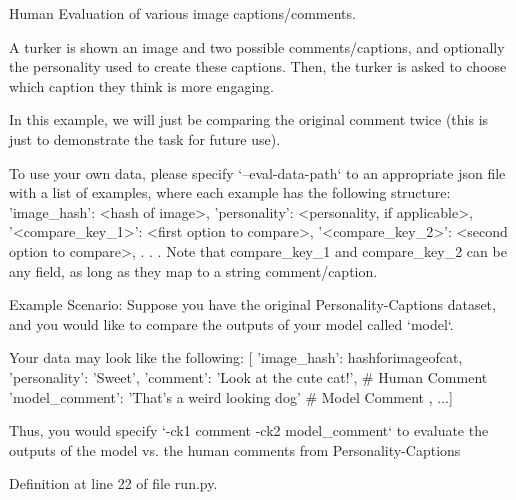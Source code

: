 \begin{DoxyVerb}Human Evaluation of various image captions/comments.

A turker is shown an image and two possible comments/captions, and
optionally the personality used to create these captions. Then, the
turker is asked to choose which caption they think is more engaging.

In this example, we will just be comparing the original comment twice
(this is just to demonstrate the task for future use).

To use your own data, please specify `--eval-data-path` to an
appropriate json file with a list of examples, where each example
has the following structure:
    {
        'image_hash': <hash of image>,
        'personality': <personality, if applicable>,
        '<compare_key_1>': <first option to compare>,
        '<compare_key_2>': <second option to compare>,
        .
        .
        .
    }
Note that compare_key_1 and compare_key_2 can be any field, as long as they
map to a string comment/caption.

Example Scenario:
    Suppose you have the original Personality-Captions dataset, and
    you would like to compare the outputs of your model called `model`.

    Your data may look like the following:
    [{
        'image_hash': hashforimageofcat,
        'personality': 'Sweet',
        'comment': 'Look at the cute cat!', # Human Comment
        'model_comment': 'That's a weird looking dog' # Model Comment
    }, ...]

    Thus, you would specify `-ck1 comment -ck2 model_comment` to evaluate
    the outputs of the model vs. the human comments from Personality-Captions
\end{DoxyVerb}
 

Definition at line 22 of file run.\+py.


